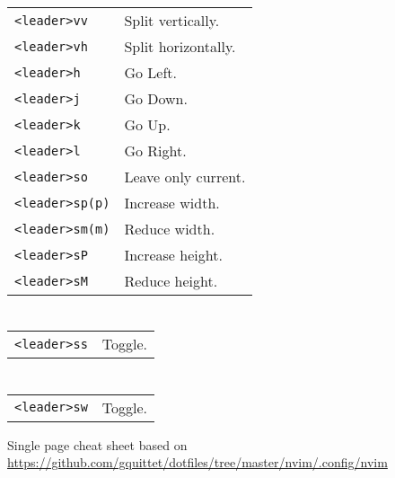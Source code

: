 \begin{multicols}{3}
\section{}
\begin{tabular}{@{}ll@{}}
	\verb!<leader>vv! & Split vertically. \\
	\verb!<leader>vh! & Split horizontally. \\
	\verb!<leader>h! & Go Left. \\
	\verb!<leader>j! & Go Down. \\
	\verb!<leader>k! & Go Up. \\
	\verb!<leader>l! & Go Right. \\
	\verb!<leader>so! & Leave only current. \\
    \verb!<leader>sp(p)! & Increase width. \\
    \verb!<leader>sm(m)! & Reduce width. \\
	\verb!<leader>sP! & Increase height. \\
	\verb!<leader>sM! & Reduce height. \\
\end{tabular}

\section{}
\begin{tabular}{@{}ll@{}}
	\verb!<leader>ss! & Toggle. \\
\end{tabular}

\section{}
\begin{tabular}{@{}ll@{}}
	\verb!<leader>sw! & Toggle. \\
\end{tabular}

Single page cheat sheet based on \url{https://github.com/gquittet/dotfiles/tree/master/nvim/.config/nvim}

\end{multicols}

